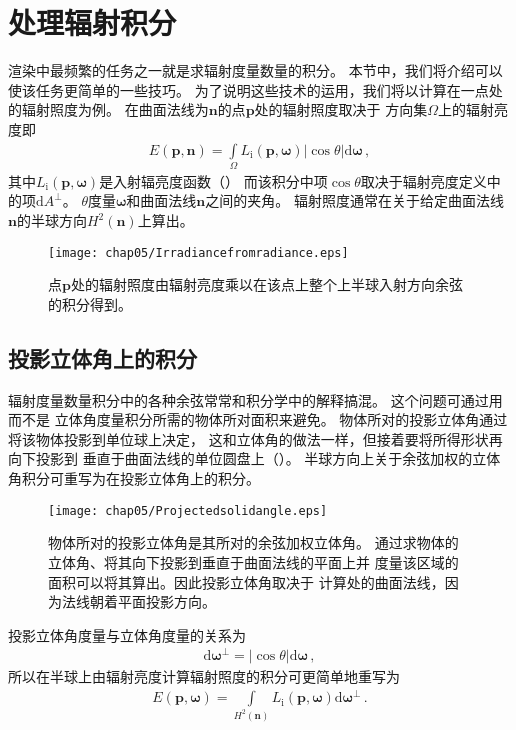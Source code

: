\section{处理辐射积分}\label{sec:处理辐射积分}

渲染中最频繁的任务之一就是求辐射度量数量的积分。
本节中，我们将介绍可以使该任务更简单的一些技巧。
为了说明这些技术的运用，我们将以计算在一点处的辐射照度为例。
在曲面法线为$\bm n$的点$\bm p$处的辐射照度取决于
方向集$\Omega$上的辐射亮度即
\begin{align}\label{eq:5.4}
    E({\bm p},{\bm n})=\int\limits_{\Omega}{L_{\mathrm{i}}({\bm p},{\bm\omega})|\cos\theta|\mathrm{d}\bm\omega}\, ,
\end{align}
其中$L_{\mathrm{i}}({\bm p},{\bm\omega})$是入射辐亮度函数（）
而该积分中项$\cos\theta$取决于辐射亮度定义中的项$\mathrm{d}A^{\perp}$。
$\theta$度量$\bm\omega$和曲面法线$\bm n$之间的夹角。
辐射照度通常在关于给定曲面法线$\bm n$的半球方向$H^2(\bm n)$上算出。
\begin{figure}[htbp]
    \centering\texttt{[image: chap05/Irradiancefromradiance.eps]}
    \caption{点$\bm p$处的辐射照度由辐射亮度乘以在该点上整个上半球入射方向余弦的积分得到。}
    \label{fig:5.12}
\end{figure}

\subsection{投影立体角上的积分}\label{sub:投影立体角上的积分}
辐射度量数量积分中的各种余弦常常和积分学中的解释搞混。
这个问题可通过用而不是
立体角度量积分所需的物体所对面积来避免。
物体所对的投影立体角通过将该物体投影到单位球上决定，
这和立体角的做法一样，但接着要将所得形状再向下投影到
垂直于曲面法线的单位圆盘上（）。
半球方向上关于余弦加权的立体角积分可重写为在投影立体角上的积分。
\begin{figure}[htbp]
    \centering\texttt{[image: chap05/Projectedsolidangle.eps]}
    \caption{物体所对的投影立体角是其所对的余弦加权立体角。
        通过求物体的立体角、将其向下投影到垂直于曲面法线的平面上并
        度量该区域的面积可以将其算出。因此投影立体角取决于
        计算处的曲面法线，因为法线朝着平面投影方向。}
    \label{fig:5.13}
\end{figure}

投影立体角度量与立体角度量的关系为
\begin{align*}
    \mathrm{d}{\bm\omega}^{\perp}=|\cos\theta|\mathrm{d}{\bm\omega}\, ,
\end{align*}
所以在半球上由辐射亮度计算辐射照度的积分可更简单地重写为
\begin{align*}
    E({\bm p},{\bm\omega})=\int\limits_{H^2({\bm n})}{L_{\mathrm{i}}({\bm p},{\bm\omega})\mathrm{d}{\bm\omega}^{\perp}}\, .
\end{align*}

